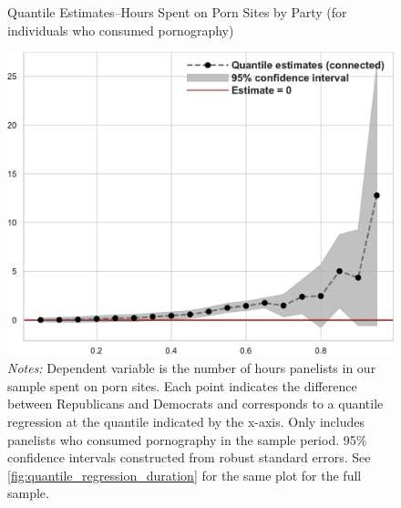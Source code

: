 \documentclass[12pt, letterpaper]{article}
\begin{document}
\begin{figure}[ht]
	\centering
	\caption{Quantile Estimates--Hours Spent on Porn Sites by Party (for individuals who consumed pornography)}
	\includegraphics[width=.55\linewidth]{../figs/quantile_reg_nonzero_duration_adult.pdf}
	\caption*{\footnotesize \emph{Notes:} 
		Dependent variable is the number of hours panelists in our sample spent on porn sites.
		Each point indicates the difference between Republicans and Democrats and corresponds to a quantile regression at the quantile indicated by the x-axis.
		Only includes panelists who consumed pornography in the sample period.
		95\% confidence intervals constructed from robust standard errors.
		See \cref{fig:quantile_regression_duration} for the same plot for the full sample.
	}
	\label{fig:quantile_regression_duration_nonzeroes}
\end{figure}
\end{document}
